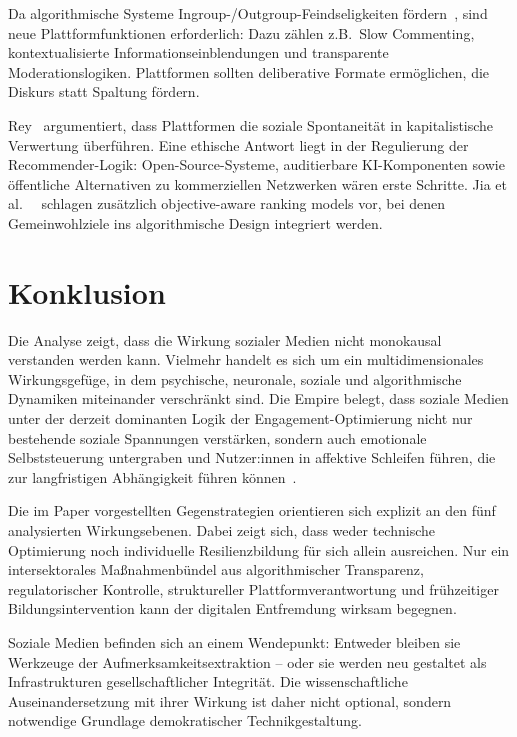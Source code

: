 Da algorithmische Systeme Ingroup-/Outgroup-Feindseligkeiten fördern~\cite{milli_engagement_2024}, sind neue
Plattformfunktionen erforderlich: Dazu zählen z.B.\ Slow Commenting, kontextualisierte Informationseinblendungen und
transparente Moderationslogiken.
Plattformen sollten deliberative Formate ermöglichen, die Diskurs statt Spaltung fördern.

Rey~\cite{rey_alienation_2012} argumentiert, dass Plattformen die soziale Spontaneität in kapitalistische Verwertung überführen.
Eine ethische Antwort liegt in der Regulierung der Recommender-Logik: Open-Source-Systeme, auditierbare KI-Komponenten
sowie öffentliche Alternativen zu kommerziellen Netzwerken wären erste Schritte.
Jia et al.\ ~\cite{jia_embedding_2024} schlagen zusätzlich objective-aware ranking models vor, bei denen Gemeinwohlziele
ins algorithmische Design integriert werden.

\section{Konklusion}\label{sec:konklusion}

Die Analyse zeigt, dass die Wirkung sozialer Medien nicht monokausal verstanden werden kann.
Vielmehr handelt es sich um ein multidimensionales Wirkungsgefüge, in dem psychische, neuronale, soziale und algorithmische
Dynamiken miteinander verschränkt sind.
Die Empire belegt, dass soziale Medien unter der derzeit dominanten Logik der Engagement-Optimierung nicht nur bestehende
soziale Spannungen verstärken, sondern auch emotionale Selbststeuerung untergraben und Nutzer:innen in affektive Schleifen
führen, die zur langfristigen Abhängigkeit führen können~\cite{milli_engagement_2024,santini_social_2024,de_social_nodate}.

Die im Paper vorgestellten Gegenstrategien orientieren sich explizit an den fünf analysierten Wirkungsebenen.
Dabei zeigt sich, dass weder technische Optimierung noch individuelle Resilienzbildung für sich allein ausreichen.
Nur ein intersektorales Maßnahmenbündel aus algorithmischer Transparenz, regulatorischer Kontrolle, struktureller
Plattformverantwortung und frühzeitiger Bildungsintervention kann der digitalen Entfremdung wirksam begegnen.

Soziale Medien befinden sich an einem Wendepunkt: Entweder bleiben sie Werkzeuge der Aufmerksamkeitsextraktion –
oder sie werden neu gestaltet als Infrastrukturen gesellschaftlicher Integrität.
Die wissenschaftliche Auseinandersetzung mit ihrer Wirkung ist daher nicht optional, sondern notwendige Grundlage demokratischer
Technikgestaltung.
